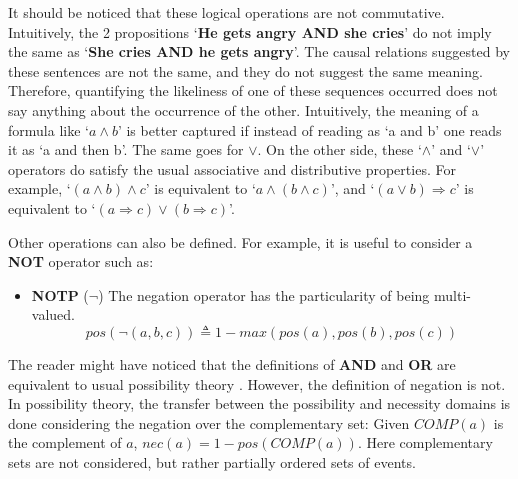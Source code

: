 \documentclass[
		twoside,openright,titlepage,numbers=noenddot,manychapters,
		headinclude,%
                footinclude=false,cleardoublepage=empty,
                BCOR=5mm,
		fontsize=11pt, %
                 enabledeprecatedfontcommands]{scrreprt}
\begin{document}
It should be noticed that these logical operations are not commutative. Intuitively, the 2 propositions ‘\textbf{He gets angry AND she cries}’ do not imply the same as ‘\textbf{She cries AND he gets angry}’. The causal relations suggested by these sentences are not the same, and they do not suggest the same meaning. Therefore, quantifying the likeliness of one of these sequences occurred does not say anything about the occurrence of the other. Intuitively, the meaning of a formula like ‘$a\wedge b$’  is better captured if instead of reading as ‘a and b’ one reads it as ‘a and then b’.  The same goes for $\vee$. On the other side, these `$\wedge$' and `$\vee$' operators do satisfy the usual associative and distributive properties. For example, ‘$(a \wedge b) \wedge c$’ is equivalent to ‘$a \wedge (b \wedge c)$’,  and ‘$(a \vee b) \Rightarrow c$’ is equivalent to ‘$(a \Rightarrow c) \vee (b \Rightarrow c)$’.

Other operations can also be defined. For example, it is useful to consider a \textbf{NOT} operator such as:
\begin{itemize}      
        \item  \textbf{NOTP} ($ \neg$) The negation operator has the particularity of being multi-valued. 
\begin{equation*}
 pos(\neg ( a,b,c )) \triangleq 1 - max(pos(a),pos(b),pos(c)) 
\end{equation*}
   \end{itemize}

The reader might have noticed that the definitions of \textbf{AND} and \textbf{OR} are equivalent to usual possibility theory \cite[]{zadeh1999fuzzy} . However, the definition of negation is not. In possibility theory, the transfer between the possibility and necessity domains is done considering the negation over the complementary set: Given $COMP(a)$ is the complement of $a$, $nec(a)=1-pos(COMP(a))$.  Here complementary sets are not considered, but rather partially ordered sets of events. %
\end{document}
